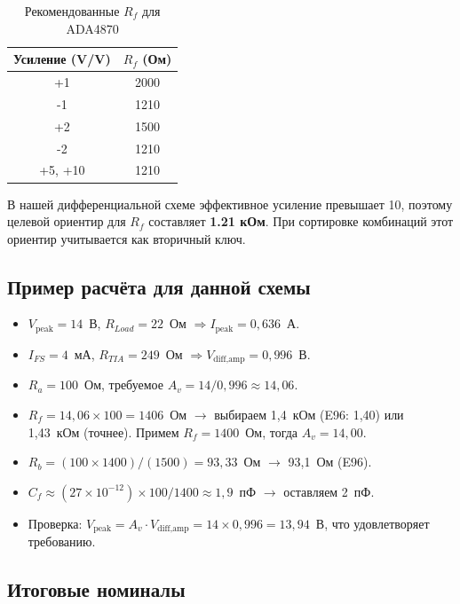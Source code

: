 \documentclass[a4paper, 12pt]{article}
\begin{document}
\begin{table}[H]
\centering
\caption{Рекомендованные \(R_f\) для ADA4870}
\label{tab:rf_rec}
\begin{tabular}{@{}cc@{}}
\toprule
\textbf{Усиление (V/V)} & \textbf{\(R_f\) (Ом)} \\
\midrule
+1  & 2000 \\
-1  & 1210 \\
+2  & 1500 \\
-2  & 1210 \\
+5, +10 & 1210 \\
\bottomrule
\end{tabular}
\end{table}

В нашей дифференциальной схеме эффективное усиление превышает 10, поэтому целевой ориентир для \(R_f\) составляет \textbf{1.21 кОм}. При сортировке комбинаций этот ориентир учитывается как вторичный ключ.

\subsection{Пример расчёта для данной схемы}

\begin{itemize}
    \item \(V_{\text{peak}} = 14\)~В, \(R_{Load} = 22\)~Ом $\Rightarrow I_{\text{peak}} = 0{,}636$~А.
    \item \(I_{FS} = 4\)~мА, \(R_{TIA} = 249\)~Ом $\Rightarrow V_{\text{diff,amp}} = 0{,}996$~В.
    \item \(R_a = 100\)~Ом, требуемое \(A_v = 14 / 0{,}996 \approx 14{,}06\).
    \item \(R_f = 14{,}06 \times 100 = 1406\)~Ом $\to$ выбираем 1{,}4~кОм (E96: 1,40) или 1,43~кОм (точнее).
        Примем \(R_f = 1400\)~Ом, тогда \(A_v = 14{,}00\).
    \item \(R_b = (100 \times 1400)/(1500) = 93{,}33\)~Ом $\to$ 93{,}1~Ом (E96).
    \item \(C_f \approx (27\times10^{-12}) \times 100 / 1400 \approx 1{,}9\)~пФ $\to$ оставляем 2~пФ.
    \item Проверка: \(V_{\text{peak}} = A_v \cdot V_{\text{diff,amp}} = 14 \times 0{,}996 = 13{,}94\)~В,
        что удовлетворяет требованию.
\end{itemize}

\subsection{Итоговые номиналы}
\end{document}
